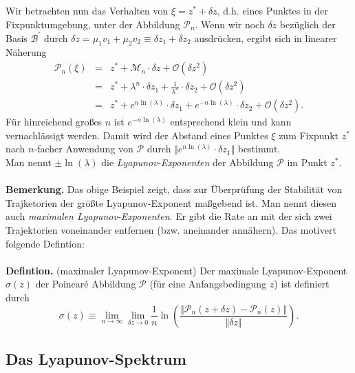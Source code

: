 \documentclass[11pt,a4paper]{article}
\begin{document}
Wir betrachten nun das Verhalten von $ \xi = z^* + \delta z $, d.h. eines Punktes in der Fixpunktumgebung, unter der Abbildung $ \mathcal{P}_n $. Wenn wir noch $ \delta z $ bezüglich der Basis  $ \mathcal{B}^' $ durch $ \delta z = \mu_1 v_1 + \mu_2 v_2 \equiv \delta z_1 + \delta z_2 $ ausdrücken, ergibt sich in linearer Näherung
\begin{eqnarray}
\mathcal{P}_n ( \xi ) & = & z^* + \mathcal{M}_n \cdot \delta z + \mathcal{O}(\delta z^2 ) \nonumber \\
 & = & z^* + \lambda^n \cdot \delta z_1 + \frac{1}{\lambda^n} \cdot \delta z_2 + \mathcal{O}(\delta z^2) \nonumber \\
 & = & z^* + e^{n \ln(\lambda)} \cdot \delta z_1 + e^{-n \ln(\lambda)} \cdot \delta z_2 + \mathcal{O}(\delta z^2). \nonumber 
\end{eqnarray} 
Für hinreichend großes $ n $ ist $ e^{-n \ln(\lambda)} $ entsprechend klein und kann vernachlässigt werden. Damit wird der Abstand eines Punktes $ \xi $ zum Fixpunkt $ z^* $ nach $ n $-facher Anwendung von $ \mathcal{P} $ durch $ \Vert e^{n \ln(\lambda)} \cdot \delta z_1 \Vert $ bestimmt. \\
Man nennt $ \pm \ln(\lambda) $ die \textit{Lyapunov-Exponenten} der Abbildung $ \mathcal{P} $ im Punkt $ z^* $. 
\\
\\
\textbf{Bemerkung.} Das obige Beispiel zeigt, dass zur Überprüfung der Stabilität von Trajketorien der größte Lyapunov-Exponent maßgebend ist. Man nennt diesen auch \textit{maximalen Lyapunov-Exponenten}. Er gibt die Rate an mit der sich zwei Trajektorien voneinander entfernen (bzw. aneinander annähern). Das motivert folgende Defintion:
\\
\\
\textbf{Defintion.} (maximaler Lyapunov-Exponent) Der maximale Lyapunov-Exponent $ \sigma(z) $ der Poincar\'{e} Abbildung $ \mathcal{P} $ (für eine Anfangsbedingung $ z $) ist definiert durch 
\[\sigma(z) \equiv \lim_{n \to \infty} \lim_{\delta z \to 0} \frac{1}{n} \ln \left(  \dfrac{\Vert \mathcal{P}_n ( z + \delta z ) - \mathcal{P}_n (z) \Vert}{\Vert \delta z \Vert } \right).  \]


\subsection{Das Lyapunov-Spektrum}
\end{document}
